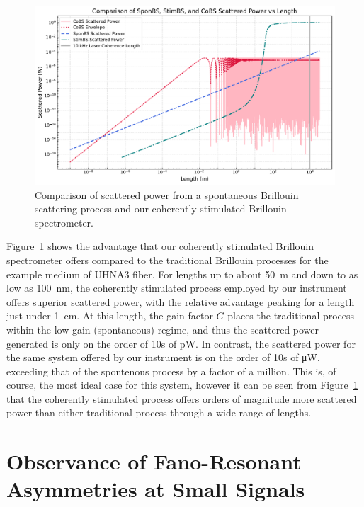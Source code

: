 \begin{figure}[ht]
\centering
\includegraphics[width=\textwidth]{figs/3-CoBS/SponBSvsStimBSvsCoBS.pdf}
\caption{Comparison of scattered power from a spontaneous Brillouin scattering process and our coherently stimulated Brillouin spectrometer.}
\label{fig:SponBSvsStimBSvsCoBS}
\end{figure}

Figure~\ref{fig:SponBSvsStimBSvsCoBS} shows the advantage that our coherently stimulated Brillouin spectrometer offers compared to the traditional Brillouin processes for the example medium of \ac{UHNA3} fiber. For lengths up to about \SI{50}{\meter} and down to as low as \SI{100}{\nano\meter}, the coherently stimulated process employed by our instrument offers superior scattered power, with the relative advantage peaking for a length just under \SI{1}{\centi\meter}. At this length, the gain factor \(G\) places the traditional process within the low-gain (spontaneous) regime, and thus the scattered power generated is only on the order of 10s of \si{\pico\watt}. In contrast, the scattered power for the same system offered by our instrument is on the order of 10s of \si{\micro\watt}, exceeding that of the spontenous process by a factor of a million. This is, of course, the most ideal case for this system, however it can be seen from Figure~\ref{fig:SponBSvsStimBSvsCoBS} that the coherently stimulated process offers orders of magnitude more scattered power than either traditional process through a wide range of lengths.

\newpage


\section{Observance of Fano-Resonant Asymmetries at Small Signals}
\label{Appendix:Fano}

